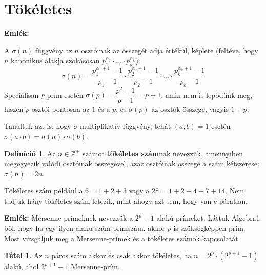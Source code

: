 \documentclass[12pt]{book}
\theoremstyle{plain} %
\theoremstyle{definition} %
\newtheorem{defi/}{Definíció}[section]
\newenvironment{defi}
  {\renewcommand{\qedsymbol}{$\clubsuit$}%
   \pushQED{\qed}\begin{defi/}}
  {\popQED\end{defi/}}
\newtheorem{theo/}{Tétel}[section]
\newenvironment{theo}
  {\renewcommand{\qedsymbol}{$\clubsuit$}%
   \pushQED{\qed}\begin{theo/}}
  {\popQED\end{theo/}}
\theoremstyle{remark}
\renewcommand\qedsymbol{$\blacksquare$}
\numberwithin{equation}{section}  %
\def\Z{\mathbb{Z}}
\begin{document}
	\section{Tökéletes}
	
	\textbf{Emlék: }
	
	A $\sigma(n)$ függvény az $n$ osztóinak az összegét adja értékül, képlete (feltéve, hogy $n$ kanonikus alakja szokásosan $p_1^{\alpha_1} \cdot \ldots \cdot p_k^{\alpha_k}$):
	\[ \sigma(n) = \dfrac{p_1^{\alpha_1+1}-1}{p_1 -1} \cdot \dfrac{p_2^{\alpha_2+1}-1}{p_2 -1} \cdot \ldots \cdot \dfrac{p_k^{\alpha_k+1}-1}{p_k -1} \]
	Speciálisan $p$ prím esetén $\sigma(p) = \dfrac{p^2-1}{p-1} = p+1$, amin nem is lepődünk meg, hiszen $p$ osztói pontosan az $1$ és a $p$, és $\sigma(p)$ az osztók összege, vagyis $1+p$.
	
	Tanultuk azt is, hogy $\sigma$ multiplikatív függvény, tehát $(a,b)=1$ esetén $\sigma(a\cdot b)= \sigma(a)\cdot \sigma(b)$.
	
	\begin{defi}
		Az $n\in \Z^{+}$ számot \textbf{tökéletes szám}nak nevezzük, amennyiben megegyezik valódi osztóinak összegével, azaz osztóinak összege a szám kétszerese: $\sigma(n) = 2n$.
	\end{defi}

	Tökéletes szám például a $6=1+2+3$ vagy a $28=1+2+4+7+14$. Nem tudjuk hány tökéletes szám létezik, mint ahogy azt sem, hogy van-e páratlan.

	\textbf{Emlék:} Mersenne-prímeknek nevezzük a $2^p-1$ alakú prímeket. Láttuk Algebra1-ből, hogy ha egy ilyen alakú szám prímszám, akkor $p$ is szükségképpen prím. Most vizsgáljuk meg a Mersenne-prímek és a tökéletes számok kapcsolatát.
	
	\begin{theo}
		Az $n$ páros szám akkor és csak akkor tökéletes, ha $n=2^p\cdot (2^{p+1} - 1)$ alakú, ahol $2^{p+1}-1$ Mersenne-prím.
	\end{theo}
\end{document}
